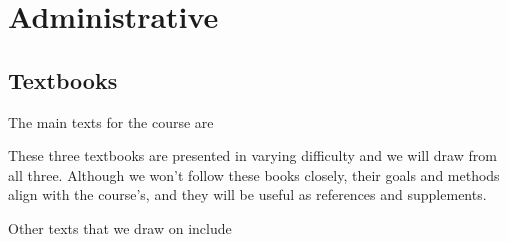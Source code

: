 \documentclass[12pt]{article}
\begin{document}
\section*{Administrative}

\subsection*{Textbooks}

The main texts for the course are

\begin{verse}  \end{verse}

\begin{verse}  \end{verse}

\begin{verse}  \end{verse}

These three textbooks are presented in varying difficulty and we will draw from all three. Although we won't follow these books closely, their goals and methods align with the course's, and they will be useful as references and supplements.

Other texts that we draw on include

\begin{verse}   \end{verse}

\begin{verse}  \end{verse}









\end{document}
